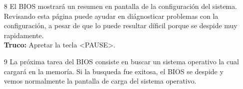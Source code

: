 \begin{enumerate}
	\item[8] El BIOS mostrará un resumen en pantalla de la configuración del sistema.  Revisando
		esta página puede ayudar en diágnosticar problemas con la configuración, a
		pesar de que lo puede resultar díficil porque se despide muy rapidamente. \\
		{\bf Truco:} Apretar la tecla <PAUSE>.

	
	
	
	

	\item[9] La próxima tarea del BIOS consiste en buscar un sistema operativo
		la cual cargará en la memoría. Si la busqueda fue exitosa, el BIOS se despide
		y vemos normalmente la pantalla de carga del sistema operativo.

	\end{enumerate}
	\newpage

